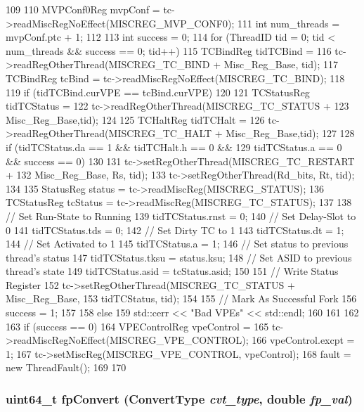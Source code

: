 \begin{DoxyCode}
109 {
110     MVPConf0Reg mvpConf = tc->readMiscRegNoEffect(MISCREG_MVP_CONF0);
111     int num_threads = mvpConf.ptc + 1;
112 
113     int success = 0;
114     for (ThreadID tid = 0; tid < num_threads && success == 0; tid++) {
115         TCBindReg tidTCBind =
116             tc->readRegOtherThread(MISCREG_TC_BIND + Misc_Reg_Base, tid);
117         TCBindReg tcBind = tc->readMiscRegNoEffect(MISCREG_TC_BIND);
118 
119         if (tidTCBind.curVPE == tcBind.curVPE) {
120 
121             TCStatusReg tidTCStatus =
122                 tc->readRegOtherThread(MISCREG_TC_STATUS +
123                                        Misc_Reg_Base,tid);
124 
125             TCHaltReg tidTCHalt =
126                 tc->readRegOtherThread(MISCREG_TC_HALT + Misc_Reg_Base,tid);
127 
128             if (tidTCStatus.da == 1 && tidTCHalt.h == 0 &&
129                 tidTCStatus.a == 0 && success == 0) {
130 
131                 tc->setRegOtherThread(MISCREG_TC_RESTART +
132                                       Misc_Reg_Base, Rs, tid);
133                 tc->setRegOtherThread(Rd_bits, Rt, tid);
134 
135                 StatusReg status = tc->readMiscReg(MISCREG_STATUS);
136                 TCStatusReg tcStatus = tc->readMiscReg(MISCREG_TC_STATUS);
137 
138                 // Set Run-State to Running
139                 tidTCStatus.rnst = 0;
140                 // Set Delay-Slot to 0
141                 tidTCStatus.tds = 0;
142                 // Set Dirty TC to 1
143                 tidTCStatus.dt = 1;
144                 // Set Activated to 1
145                 tidTCStatus.a = 1;
146                 // Set status to previous thread's status
147                 tidTCStatus.tksu = status.ksu;
148                 // Set ASID to previous thread's state
149                 tidTCStatus.asid = tcStatus.asid;
150 
151                 // Write Status Register
152                 tc->setRegOtherThread(MISCREG_TC_STATUS + Misc_Reg_Base,
153                                       tidTCStatus, tid);
154 
155                 // Mark As Successful Fork
156                 success = 1;
157             }
158         } else {
159             std::cerr << "Bad VPEs" << std::endl;
160         }
161     }
162 
163     if (success == 0) {
164         VPEControlReg vpeControl =
165             tc->readMiscRegNoEffect(MISCREG_VPE_CONTROL);
166         vpeControl.excpt = 1;
167         tc->setMiscReg(MISCREG_VPE_CONTROL, vpeControl);
168         fault = new ThreadFault();
169     }
170 }
\end{DoxyCode}
\hypertarget{namespaceMipsISA_aef24bb5b95ababfcc53737354f899410}{
\subsubsection[{fpConvert}]{\setlength{\rightskip}{0pt plus 5cm}uint64\_\-t fpConvert ({\bf ConvertType} {\em cvt\_\-type}, \/  double {\em fp\_\-val})}}
\label{namespaceMipsISA_aef24bb5b95ababfcc53737354f899410}



